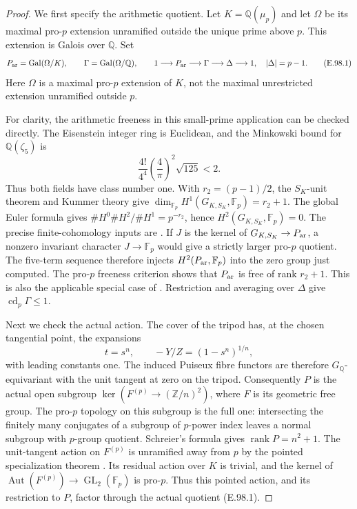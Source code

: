 \begin{proof}
We first specify the arithmetic quotient.  Let \(K=\mathbb Q(\mu_p)\)
and let \(\Omega\) be its maximal pro-\(p\) extension unramified outside
the unique prime above \(p\).  This extension is Galois over
\(\mathbb Q\).  Set
\[
 P_{\rm ar}=\operatorname{Gal}(\Omega/K),\qquad
 \Gamma=\operatorname{Gal}(\Omega/\mathbb Q),\qquad
 1\longrightarrow P_{\rm ar}\longrightarrow\Gamma
 \longrightarrow\Delta\longrightarrow1,
 \quad |\Delta|=p-1.                                      \tag{E.98.1}
\]
Here \(\Omega\) is a maximal pro-\(p\) extension of \(K\), not the
maximal unrestricted extension unramified outside \(p\).

For clarity, the arithmetic freeness in this small-prime application
can be checked directly.  The Eisenstein integer ring is Euclidean,
and the Minkowski bound for \(\mathbb Q(\zeta_5)\) is
\[
 \frac{4!}{4^4}\left(\frac4\pi\right)^2\sqrt{125}<2.
\]
Thus both fields have class number one.  With
\(r_2=(p-1)/2\), the \(S_K\)-unit theorem and Kummer theory give
\(\dim_{\mathbb F_p}H^1(G_{K,S_K},\mathbb F_p)=r_2+1\).
The global Euler formula gives
\(\#H^0\#H^2/\#H^1=p^{-r_2}\), hence
\(H^2(G_{K,S_K},\mathbb F_p)=0\).
The precise finite-cohomology inputs are
\citet[I.4.15, p.~62; I.5.1, pp.~66--67]{CohMilneADT}.
If \(J\) is the kernel of \(G_{K,S_K}\to P_{\rm ar}\), a nonzero
invariant character \(J\to\mathbb F_p\) would give a strictly larger
pro-\(p\) quotient.  The five-term sequence therefore injects
\(H^2(P_{\rm ar},\mathbb F_p)\) into the zero group just computed.
The pro-\(p\) freeness criterion shows that \(P_{\rm ar}\) is free of
rank \(r_2+1\).  This is also the applicable special case of
\citet[Lemma 3.2, author p.~14]{LitHoshi2010}.
Restriction and averaging over \(\Delta\) give
\(\operatorname{cd}_p\Gamma\leq1\).

Next we check the actual action.  The cover of the tripod has, at the
chosen tangential point, the expansions
\[
 t=s^n,\qquad -Y/Z=(1-s^n)^{1/n},                         \tag{E.98.2}
\]
with leading constants one.  The induced Puiseux fibre functors are
therefore \(G_{\mathbb Q}\)-equivariant with the unit tangent at zero
on the tripod.  Consequently \(P\) is the actual open subgroup
\(\ker(F^{(p)}\to(\mathbb Z/n)^2)\), where \(F\) is its geometric
free group.  The pro-\(p\) topology on this subgroup is the full one:
intersecting the finitely many conjugates of a subgroup of \(p\)-power
index leaves a normal subgroup with \(p\)-group quotient.
Schreier's formula gives \(\operatorname{rank}P=n^2+1\).
The unit-tangent action on \(F^{(p)}\) is unramified away from \(p\)
by the pointed specialization theorem
\citep[Definition 2.0 and Theorem 2.1, pp.~198--200]{AuditWojtkowiak2007}.
Its residual action over \(K\) is trivial, and the kernel of
\(\operatorname{Aut}(F^{(p)})\to\operatorname{GL}_2(\mathbb F_p)\)
is pro-\(p\).  Thus this pointed action, and its restriction to
\(P\), factor through the actual quotient (E.98.1).


\end{proof}
